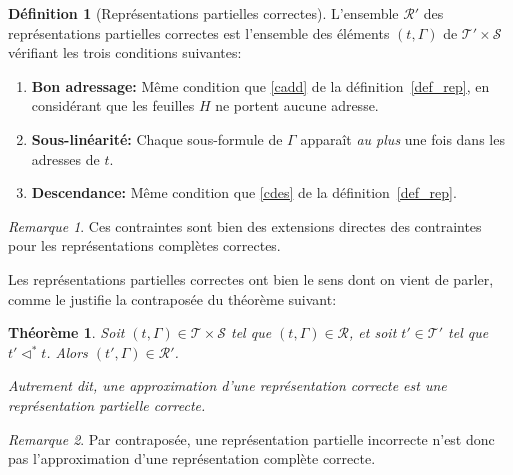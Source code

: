 \documentclass[11pt,a4paper]{article}
\theoremstyle{plain}
\newtheorem{theorem}{Théorème}
\theoremstyle{definition}
\newtheorem{definition}{Définition}
\theoremstyle{remark}
\newtheorem{remark}{Remarque}
\newcommand*{\sequent}{\Gamma}
\newcommand*{\sequents}{\ensuremath{\mathcal{S}}}
\newcommand*{\trees}{\ensuremath{\mathcal{T}}}
\newcommand*{\treespartial}{\ensuremath{\mathcal{T'}}}
\newcommand*{\representationslarge}{\ensuremath{\trees \times \sequents}}
\newcommand*{\representations}{\ensuremath{\mathcal{R}}}
\newcommand*{\representationspartiallarge}{\ensuremath{\treespartial \times \sequents}}
\newcommand*{\representationspartial}{\ensuremath{\mathcal{R'}}}
\newcommand*{\relapprox}{\ensuremath{\triangleleft}}
\newcommand*{\relapproxlarge}{\ensuremath{\relapprox^*}}
\newcommand*{\unknown}{H}
\newcommand*{\caddpartial}{(a)}
\newcommand*{\clinpartial}{(b')}
\newcommand*{\cdespartial}{(c)}
\begin{document}
\begin{definition}[Représentations partielles correctes]
    \label{def_rep_partial}
    L'ensemble \representationspartial{} des représentations partielles correctes est l'ensemble des éléments $(t, \sequent)$ de $\representationspartiallarge$ vérifiant les trois conditions suivantes:
    
    \begin{enumerate}
    \item[\caddpartial] \textbf{Bon adressage:} Même condition que \ref{cadd} de la définition~\ref{def_rep}, en considérant que les feuilles $\unknown$ ne portent aucune adresse.
    \item[\clinpartial] \textbf{Sous-linéarité:} Chaque sous-formule de $\sequent$ apparaît \emph{au plus} une fois dans les adresses de $t$.
    \item[\cdespartial] \textbf{Descendance:} Même condition que \ref{cdes} de la définition~\ref{def_rep}.
    \end{enumerate}
\end{definition}

\begin{remark}
    Ces contraintes sont bien des extensions directes des contraintes pour les représentations complètes correctes.
\end{remark}

Les représentations partielles correctes ont bien le sens dont on vient de parler, comme le justifie la contraposée du théorème suivant:

\begin{theorem}
    \label{approxofcorrect}
    Soit $(t, \sequent) \in \representationslarge$ tel que $(t, \sequent) \in \representations$, et soit $t' \in \treespartial$ tel que $t' \relapproxlarge t$. Alors $(t', \sequent) \in \representationspartial$.
    
    Autrement dit, une approximation d'une représentation correcte est une représentation partielle correcte.
\end{theorem}

\begin{remark}
    Par contraposée, une représentation partielle incorrecte n'est donc pas l'approximation d'une représentation complète correcte.
\end{remark}
\end{document}
